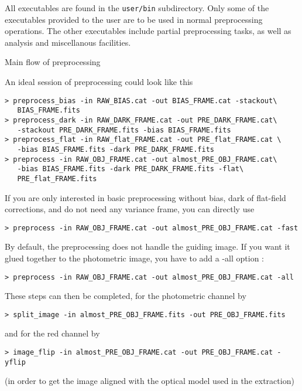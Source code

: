 %
%
\label{S:Executables}

All executables are found in the {\tt user/bin} subdirectory.
Only some of the executables provided to the user are to be used in normal
preprocessing operations. The other executables include partial
preprocessing tasks, as well as analysis and miscellanous facilities.

\begin{subsection}{Main flow of preprocessing}

An ideal session of preprocessing could look like this
\begin{verbatim}
> preprocess_bias -in RAW_BIAS.cat -out BIAS_FRAME.cat -stackout\
   BIAS_FRAME.fits 
> preprocess_dark -in RAW_DARK_FRAME.cat -out PRE_DARK_FRAME.cat\
   -stackout PRE_DARK_FRAME.fits -bias BIAS_FRAME.fits
> preprocess_flat -in RAW_flat_FRAME.cat -out PRE_flat_FRAME.cat \
   -bias BIAS_FRAME.fits -dark PRE_DARK_FRAME.fits
> preprocess -in RAW_OBJ_FRAME.cat -out almost_PRE_OBJ_FRAME.cat\
   -bias BIAS_FRAME.fits -dark PRE_DARK_FRAME.fits -flat\
   PRE_flat_FRAME.fits 
\end{verbatim}
If you are only interested in basic preprocessing without bias, dark
of flat-field corrections, and do not need any variance frame, you can
directly use 
\begin{verbatim}
> preprocess -in RAW_OBJ_FRAME.cat -out almost_PRE_OBJ_FRAME.cat -fast
\end{verbatim}
By default, the preprocessing does not handle the guiding image. If
you want it glued together to the photometric image, you have to add a
-all option : 
\begin{verbatim}
> preprocess -in RAW_OBJ_FRAME.cat -out almost_PRE_OBJ_FRAME.cat -all
\end{verbatim}

These steps can then be completed,
for the photometric channel by
\begin{verbatim}
> split_image -in almost_PRE_OBJ_FRAME.fits -out PRE_OBJ_FRAME.fits
\end{verbatim}   
and for the red channel by 
\begin{verbatim}
> image_flip -in almost_PRE_OBJ_FRAME.cat -out PRE_OBJ_FRAME.cat -yflip
\end{verbatim}
(in order to get the image aligned with
the optical model used in the extraction)


\end{subsection}
